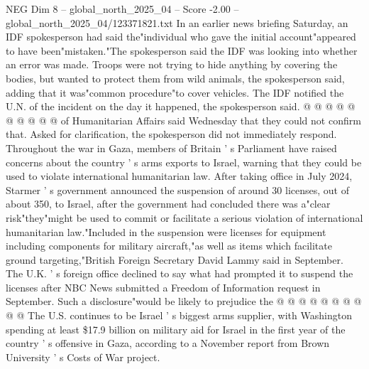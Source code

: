 \begin{textsample}{NEG Dim 8 – global\_north\_2025\_04 – Score -2.00 – global\_north\_2025\_04/123371821.txt}
In an earlier news briefing Saturday, an IDF spokesperson had said the"individual who gave the initial account"appeared to have been"mistaken."The spokesperson said the IDF was looking into whether an error was made.
Troops were not trying to hide anything by covering the bodies, but wanted to protect them from wild animals, the spokesperson said, adding that it was"common procedure"to cover vehicles.
The IDF notified the U.N. of the incident on the day it happened, the spokesperson said. @ @ @ @ @ @ @ @ @ @ of Humanitarian Affairs said Wednesday that they could not confirm that.
Asked for clarification, the spokesperson did not immediately respond.
Throughout the war in Gaza, members of Britain ' s Parliament have raised concerns about the country ' s arms exports to Israel, warning that they could be used to violate international humanitarian law.
After taking office in July 2024, Starmer ' s government announced the suspension of around 30 licenses, out of about 350, to Israel, after the government had concluded there was a"clear risk"they"might be used to commit or facilitate a serious violation of international humanitarian law."Included in the suspension were licenses for equipment including components for military aircraft,"as well as items which facilitate ground targeting,"British Foreign Secretary David Lammy said in September.
The U.K. ' s foreign office declined to say what had prompted it to suspend the licenses after NBC News submitted a Freedom of Information request in September.
Such a disclosure"would be likely to prejudice the @ @ @ @ @ @ @ @ @ @ The U.S. continues to be Israel ' s biggest arms supplier, with Washington spending at least \$17.9 billion on military aid for Israel in the first year of the country ' s offensive in Gaza, according to a November report from Brown University ' s Costs of War project.

\end{textsample}
